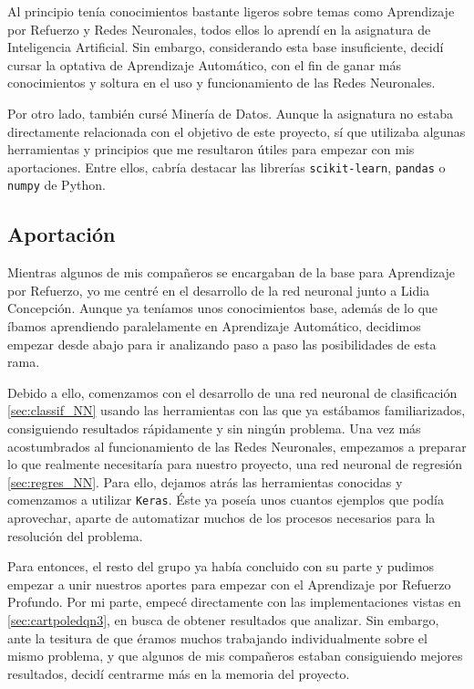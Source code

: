Al principio tenía conocimientos bastante ligeros sobre temas como Aprendizaje por Refuerzo y Redes Neuronales, todos ellos lo aprendí en la asignatura de Inteligencia Artificial. Sin embargo, considerando esta base insuficiente, decidí cursar la optativa de Aprendizaje Automático, con el fin de ganar más conocimientos y soltura en el uso y funcionamiento de las Redes Neuronales.

Por otro lado, también cursé Minería de Datos. Aunque la asignatura no estaba directamente relacionada con el objetivo de este proyecto, sí que utilizaba algunas herramientas y principios que me resultaron útiles para empezar con mis aportaciones. Entre ellos, cabría destacar las librerías \texttt{scikit-learn}, \texttt{pandas} o \texttt{numpy} de Python. 


\subsection{Aportación}

Mientras algunos de mis compañeros se encargaban de la base para Aprendizaje por Refuerzo, yo me centré en el desarrollo de la red neuronal junto a Lidia Concepción. Aunque ya teníamos unos conocimientos base, además de lo que íbamos aprendiendo paralelamente en Aprendizaje Automático, decidimos empezar desde abajo para ir analizando paso a paso las posibilidades de esta rama.

Debido a ello, comenzamos con el desarrollo de una red neuronal de clasificación \ref{sec:classif_NN} usando las herramientas con las que ya estábamos familiarizados, consiguiendo resultados rápidamente y sin ningún problema. Una vez más acostumbrados al funcionamiento de las Redes Neuronales, empezamos a preparar lo que realmente necesitaría para nuestro proyecto, una red neuronal de regresión \ref{sec:regres_NN}. Para ello, dejamos atrás las herramientas conocidas y comenzamos a utilizar \texttt{Keras}. Éste ya poseía unos cuantos ejemplos que podía aprovechar, aparte de automatizar muchos de los procesos necesarios para la resolución del problema.

Para entonces, el resto del grupo ya había concluido con su parte y pudimos empezar a unir nuestros aportes para empezar con el Aprendizaje por Refuerzo Profundo. Por mi parte, empecé directamente con las implementaciones vistas en \ref{sec:cartpoledqn3}, en busca de obtener resultados que analizar. Sin embargo, ante la tesitura de que éramos muchos trabajando individualmente sobre el mismo problema, y que algunos de mis compañeros estaban consiguiendo mejores resultados, decidí centrarme más en la memoria del proyecto.

